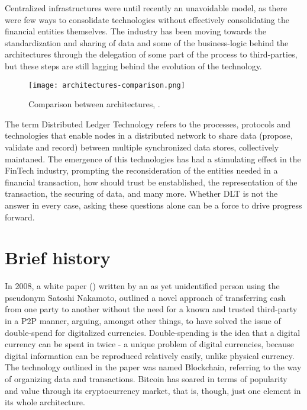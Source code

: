 Centralized infrastructures were until recently an unavoidable model, as there were few ways to consolidate technologies without effectively consolidating the financial entities themselves. The industry has been moving towards the standardization and sharing of data and some of the business-logic behind the architectures through the delegation of some part of the process to third-parties, but these steps are still lagging behind the evolution of the technology. \\

\begin{figure}[t]
    \centering
    \texttt{[image: architectures-comparison.png]}
    \caption{
        Comparison between architectures, \cite{cordawhitepaper}. 
        }
\end{figure}


The term Distributed Ledger Technology refers to the processes, protocols and technologies that enable nodes in a distributed network to share data (propose, validate and record) between multiple synchronized data stores, collectively maintaned. The emergence of this technologies has had a stimulating effect in the FinTech industry, prompting the reconsideration of the entities needed in a financial transaction, how should trust be enstablished, the representation of the transaction, the securing of data, and many more. Whether DLT is not the answer in every case, asking these questions alone can be a force to drive progress forward.

\section{Brief history}
In 2008, a white paper (\cite{bitcoinpaper}) written by an as yet unidentified person using the pseudonym Satoshi Nakamoto, outlined a novel approach of transferring cash from one party to another without the need for a known and trusted third-party in a P2P manner, arguing, amongst other things, to have solved the issue of double-spend for digitalized currencies. Double-spending is the idea that a digital currency can be spent in twice - a unique problem of digital currencies, because digital information can be reproduced relatively easily, unlike physical currency. \\

The technology outlined in the paper was named Blockchain, referring to the way of organizing data and transactions. Bitcoin has soared in terms of popularity and value through its cryptocurrency market, that is, though, just one element in its whole architecture. \\

